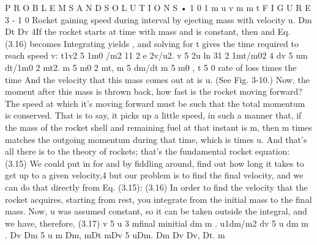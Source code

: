 \documentclass[10pt,oneside]{article}
\begin{document}
P R O B L E M S  A N D  S O L U T I O N S • 1 0 1 m u v m   m t F I G U R E  3 - 1 0 Rocket gaining speed during interval by ejecting mass with velocity u. Dm Dt Dv 4If the rocket starts at time with mass and is constant, then and Eq. (3.16) becomes Integrating yields , and solving for t gives the time required to reach speed v: t1v2 5 1m0 /m2 11 2 e 2v/u2. v 5 2u ln 31 2 1mt/m02 4 dv 5 um dt/1m0 2 mt2. m 5 m0 2 mt, m 5 dm/dt m 5 m0 , t 5 0 rate of loss times the time And the velocity that this mass comes out at is u. (See Fig. 3-10.) Now, the moment after this mass is thrown back, how fast is the rocket moving forward? The speed at which it’s moving forward must be such that the total momentum is conserved. That is to say, it picks up a little speed, in such a manner that, if the mass of the rocket shell and remaining fuel at that instant is m, then m times matches the outgoing momentum during that time, which is times u. And that’s all there is to the theory of rockets; that’s the fundamental rocket equation: (3.15) We could put in for and by fiddling around, find out how long it takes to get up to a given velocity,4 but our problem is to find the final velocity, and we can do that directly from Eq. (3.15): (3.16) In order to find the velocity that the rocket acquires, starting from rest, you integrate from the initial mass to the final mass. Now, u was assumed constant, so it can be taken outside the integral, and we have, therefore, (3.17) v 5 u 3 mfinal minitial dm m . u1dm/m2 dv 5 u dm m . Dv Dm 5 u m Dm, mDt mDv 5 uDm. Dm Dv Dv, Dt. m\par
\end{document}
